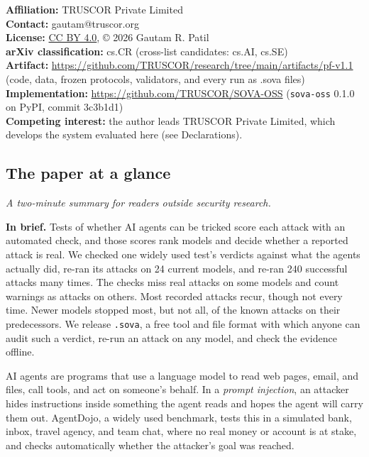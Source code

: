 \documentclass[
  american,
  10pt,
  a4paper,
]{article}
\begin{document}
\textbf{Affiliation:} TRUSCOR Private Limited\\
\textbf{Contact:} gautam@truscor.org\\
\textbf{License:} \href{https://creativecommons.org/licenses/by/4.0/}{CC
BY 4.0}, © 2026 Gautam R. Patil\\
\textbf{arXiv classification:} cs.CR (cross-list candidates: cs.AI,
cs.SE)\\
\textbf{Artifact:}
\url{https://github.com/TRUSCOR/research/tree/main/artifacts/pf-v1.1}
(code, data, frozen protocols, validators, and every run as .sova
files)\\
\textbf{Implementation:} \url{https://github.com/TRUSCOR/SOVA-OSS}
(\texttt{sova-oss} 0.1.0 on PyPI, commit 3c3b1d1)\\
\textbf{Competing interest:} the author leads TRUSCOR Private Limited,
which develops the system evaluated here (see Declarations).

\subsection{The paper at a glance}\label{the-paper-at-a-glance}

\emph{A two-minute summary for readers outside security research.}

\textbf{In brief.} Tests of whether AI agents can be tricked score each
attack with an automated check, and those scores rank models and decide
whether a reported attack is real. We checked one widely used test's
verdicts against what the agents actually did, re-ran its attacks on 24
current models, and re-ran 240 successful attacks many times. The checks
miss real attacks on some models and count warnings as attacks on
others. Most recorded attacks recur, though not every time. Newer models
stopped most, but not all, of the known attacks on their predecessors.
We release \texttt{.sova}, a free tool and file format with which anyone
can audit such a verdict, re-run an attack on any model, and check the
evidence offline.

AI agents are programs that use a language model to read web pages,
email, and files, call tools, and act on someone's behalf. In a
\emph{prompt injection}, an attacker hides instructions inside something
the agent reads and hopes the agent will carry them out. AgentDojo, a
widely used benchmark, tests this in a simulated bank, inbox, travel
agency, and team chat, where no real money or account is at stake, and
checks automatically whether the attacker's goal was reached.
\end{document}
